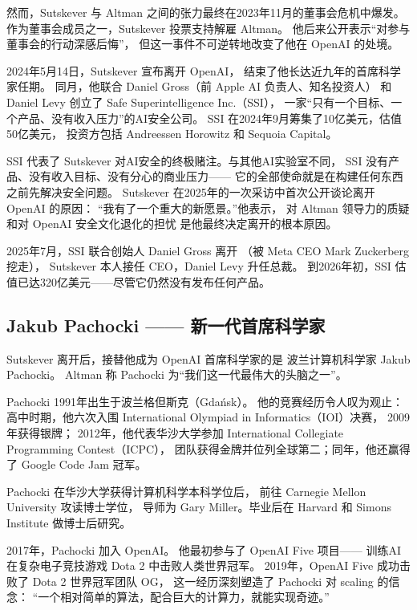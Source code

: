 然而，Sutskever 与 Altman 之间的张力最终在2023年11月的董事会危机中爆发。
作为董事会成员之一，Sutskever 投票支持解雇 Altman。
他后来公开表示``对参与董事会的行动深感后悔''，
但这一事件不可逆转地改变了他在 OpenAI 的处境。

2024年5月14日，Sutskever 宣布离开 OpenAI，
结束了他长达近九年的首席科学家任期。
同月，他联合 Daniel Gross（前 Apple AI 负责人、知名投资人）
和 Daniel Levy 创立了 Safe Superintelligence Inc.（SSI），
一家``只有一个目标、一个产品、没有收入压力''的AI安全公司。
SSI 在2024年9月筹集了10亿美元，估值50亿美元，
投资方包括 Andreessen Horowitz 和 Sequoia Capital。

\begin{whybox}
SSI 代表了 Sutskever 对AI安全的终极赌注。与其他AI实验室不同，
SSI 没有产品、没有收入目标、没有分心的商业压力——
它的全部使命就是在构建任何东西之前先解决安全问题。
Sutskever 在2025年的一次采访中首次公开谈论离开 OpenAI 的原因：
``我有了一个重大的新愿景。''他表示，
对 Altman 领导力的质疑和对 OpenAI 安全文化退化的担忧
是他最终决定离开的根本原因。

2025年7月，SSI 联合创始人 Daniel Gross 离开
（被 Meta CEO Mark Zuckerberg 挖走），
Sutskever 本人接任 CEO，Daniel Levy 升任总裁。
到2026年初，SSI 估值已达320亿美元——尽管它仍然没有发布任何产品。
\end{whybox}


\subsection{Jakub Pachocki —— 新一代首席科学家}
\label{subsec:jakub-pachocki}

Sutskever 离开后，接替他成为 OpenAI 首席科学家的是
波兰计算机科学家 Jakub Pachocki。
Altman 称 Pachocki 为``我们这一代最伟大的头脑之一''。

Pachocki 1991年出生于波兰格但斯克（Gda\'{n}sk）。
他的竞赛经历令人叹为观止：
高中时期，他六次入围 International Olympiad in Informatics（IOI）决赛，
2009年获得银牌；
2012年，他代表华沙大学参加 International Collegiate Programming Contest（ICPC），
团队获得金牌并位列全球第二；同年，他还赢得了 Google Code Jam 冠军。

Pachocki 在华沙大学获得计算机科学本科学位后，
前往 Carnegie Mellon University 攻读博士学位，
导师为 Gary Miller。毕业后在 Harvard 和 Simons Institute 做博士后研究。

2017年，Pachocki 加入 OpenAI。
他最初参与了 OpenAI Five 项目——
训练AI在复杂电子竞技游戏 Dota 2 中击败人类世界冠军。
2019年，OpenAI Five 成功击败了 Dota 2 世界冠军团队 OG，
这一经历深刻塑造了 Pachocki 对 scaling 的信念：
``一个相对简单的算法，配合巨大的计算力，就能实现奇迹。''

